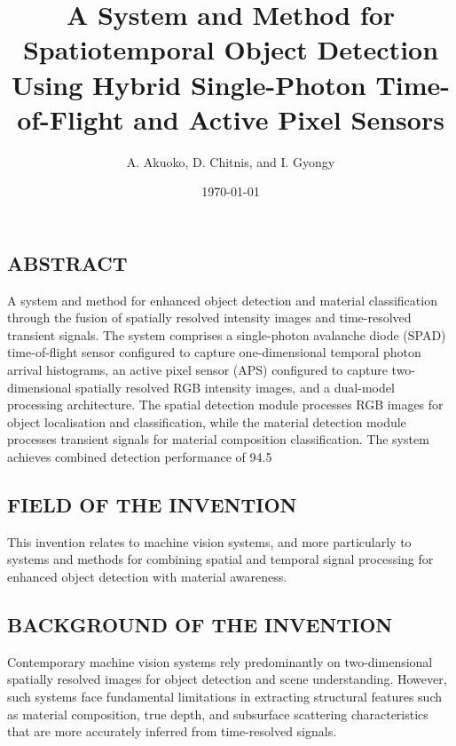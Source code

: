 \documentclass[11pt,a4paper]{article}
\title{A System and Method for Spatiotemporal Object Detection Using Hybrid Single-Photon Time-of-Flight and Active Pixel Sensors}
\author{A. Akuoko, D. Chitnis, and I. Gyongy}
\date{\today}
\begin{document}
\maketitle
\newpage

\subsection{ABSTRACT}

A system and method for enhanced object detection and material classification through the fusion of spatially resolved intensity images and time-resolved transient signals. The system comprises a single-photon avalanche diode (SPAD) time-of-flight sensor configured to capture one-dimensional temporal photon arrival histograms, an active pixel sensor (APS) configured to capture two-dimensional spatially resolved RGB intensity images, and a dual-model processing architecture. The spatial detection module processes RGB images for object localisation and classification, while the material detection module processes transient signals for material composition classification. The system achieves combined detection performance of 94.5%

\vspace{0.5em}
\subsection{FIELD OF THE INVENTION}

This invention relates to machine vision systems, and more particularly to systems and methods for combining spatial and temporal signal processing for enhanced object detection with material awareness.

\vspace{0.5em}
\subsection{BACKGROUND OF THE INVENTION}

Contemporary machine vision systems rely predominantly on two-dimensional spatially resolved images for object detection and scene understanding. However, such systems face fundamental limitations in extracting structural features such as material composition, true depth, and subsurface scattering characteristics that are more accurately inferred from time-resolved signals.
\end{document}
